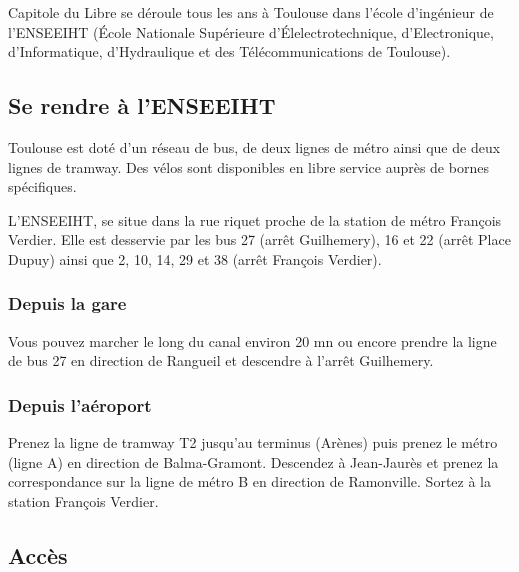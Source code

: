 
Capitole du Libre se déroule tous les ans à Toulouse dans l'école d'ingénieur de l'ENSEEIHT (École Nationale Supérieure d'Élelectrotechnique, d'Electronique, d'Informatique, d'Hydraulique et des Télécommunications de Toulouse). 

\subsection{Se rendre à l'ENSEEIHT}

Toulouse est doté d'un réseau de bus, de deux lignes de métro ainsi que de
deux lignes de tramway. Des vélos sont disponibles en libre service auprès
de bornes spécifiques.

L'ENSEEIHT, se situe dans la rue riquet
 proche de la station de métro François Verdier. Elle est desservie
par les bus 27 (arrêt Guilhemery), 16 et 22 (arrêt Place Dupuy) ainsi que 2,
10, 14, 29 et 38 (arrêt François Verdier).

\subsubsection*{Depuis la gare}

Vous pouvez marcher le long du canal environ 20 mn ou encore prendre la
ligne de bus 27 en direction de Rangueil et descendre à l'arrêt Guilhemery.

\subsubsection*{Depuis l'aéroport}

Prenez la ligne de tramway T2 jusqu'au terminus (Arènes) puis prenez le métro
(ligne A) en direction de Balma-Gramont. Descendez à Jean-Jaurès et prenez
la correspondance sur la ligne de métro B en direction de Ramonville. Sortez
à la station François Verdier.

\subsection{Accès}



